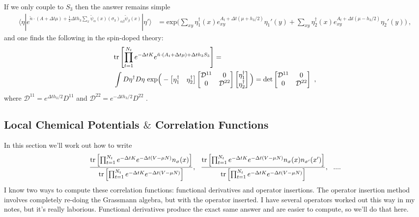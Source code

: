 If we only couple to $S_3$ then the answer remains simple 
\begin{align*}
\langle \eta | e^{  \tilde{n} \cdot (A+\Delta t \mu) + \frac{1}{2}  \Delta t h_3 \sum_x \tilde{\psi}_{\alpha}(x) (\sigma_3)_{\alpha \beta} \tilde{\psi}_{\beta}(x)  } | \eta' \rangle 
& = 
\text{exp}\Bigg( 
\sum_{xy}\eta^{\dagger}_1(x) e^{A_t + \Delta t (\mu + h_3 / 2)}_{xy} \eta_1'(y) + \sum_{xy}\eta^{\dagger}_2(x) e^{A_t + \Delta t (\mu - h_3 / 2)}_{xy} \eta_2'(y) \Bigg)~,
\end{align*}
and one finds the following in the spin-doped theory:
\begin{align*}
& \text{tr}\left[\prod_{t=1}^{N_t} e^{-\Delta t K}  e^{ \tilde{n}\cdot (A_t + \Delta t \mu) + \Delta t h_3 S_3} \right]  
= \\
& \int{}  D\eta^{\dagger} D\eta~ 
\text{exp}\Big(-
\begin{bmatrix}
\eta_1^{\dagger} & \eta_2^{\dagger}
\end{bmatrix}
\begin{bmatrix}
\mathcal{D}^{11} & 0 \\ 
0 & \mathcal{D}^{22}
\end{bmatrix}
\begin{bmatrix}
\eta_1^{\dagger} \\ \eta_2^{\dagger}
\end{bmatrix}
 \Big) = \text{det}
 \begin{bmatrix}
\mathcal{D}^{11} & 0 \\ 
0 & \mathcal{D}^{22}
\end{bmatrix}~,
\end{align*}
where $\mathcal{D}^{11} = e^{\Delta t h_3 / 2 }D^{11}$ and $\mathcal{D}^{22} = e^{-\Delta t h_3 / 2 }D^{22}$ .


\subsection{Local Chemical Potentials $\&$ Correlation Functions}
In this section we'll work out how to write
\begin{equation*}
\frac{\text{tr}\left[\prod_{t=1}^{N_t} e^{-\Delta t K }  e^{-\Delta t (V -\mu N)} n_{\sigma}(x)\right]}{\text{tr}\left[\prod_{t=1}^{N_t} e^{-\Delta t K }  e^{-\Delta t (V -\mu N)}  \right] }, ~~ \frac{ \text{tr}\left[\prod_{t=1}^{N_t} e^{-\Delta t K }  e^{-\Delta t (V -\mu N)} n_{\sigma}(x) n_{\sigma'}(x')\right] }{ \text{tr}\left[\prod_{t=1}^{N_t} e^{-\Delta t K }  e^{-\Delta t (V -\mu N)}  \right] }, ~~ ....
\end{equation*}
I know two ways to compute these correlation functions: functional derivatives and operator insertions. The operator insertion method involves completely re-doing the Grassmann algebra, but with the operator inserted. I have several operators worked out this way in my notes, but it's really laborious. Functional derivatives produce the exact same answer and are easier to compute, so we'll do that here.

